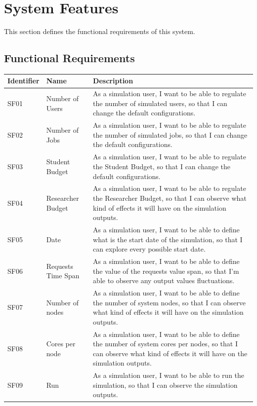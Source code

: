\documentclass{scrreprt}
\begin{document}
\chapter{System Features}
This section defines the functional requirements of this system.

\section{Functional Requirements}
\begin{center}
    \begin{longtable}{|M{1.5cm}|M{4cm}|M{8cm}|}
        \hline
	    Identifier & Name & Description\\
        \hline
        SF01 & Number of Users & As a simulation user, I want to be able to regulate the number of simulated users, so that I can change the default configurations.  \\
        \hline
        SF02 & Number of Jobs & As a simulation user, I want to be able to regulate the number of simulated jobs, so that I can change the default configurations.  \\
        \hline
        SF03 & Student Budget & As a simulation user, I want to be able to regulate the Student Budget, so that I can change the default configurations.  \\
        \hline
        SF04 & Researcher Budget & As a simulation user, I want to be able to regulate the Researcher Budget, so that I can observe what kind of effects it will have on the simulation outputs.  \\
        \hline
        SF05 & Date & As a simulation user, I want to be able to define what is the start date of the simulation, so that I can explore every possible start date.  \\
        \hline
        SF06 & Requests Time Span & As a simulation user, I want to be able to define the value of the requests value span, so that I'm able to observe any output values fluctuations.  \\
        \hline
        SF07 & Number of nodes & As a simulation user, I want to be able to define the number of system nodes, so that I can observe what kind of effects it will have on the simulation outputs.   \\
        \hline
        SF08 & Cores per node & As a simulation user, I want to be able to define the number of system cores per nodes, so that I can observe what kind of effects it will have on the simulation outputs.   \\
        \hline
        SF09 & Run & As a simulation user, I want to be able to run the simulation, so that I can observe the simulation outputs.   \\
        \hline
    \end{longtable}
\end{center}
\end{document}
